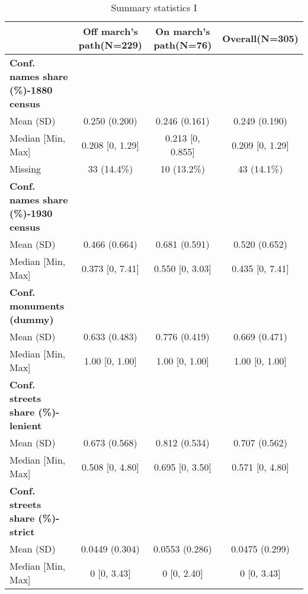 \begin{table}[h]

\caption{\label{tab:desc_stat_names}Summary statistics I}
\centering
\fontsize{8}{10}\selectfont
\begin{tabular}[t]{>{}lccc}
\toprule
 & Off march's path(N=229) & On march's path(N=76) & Overall(N=305)\\
\midrule
\textbf{Conf. names share (\%)-1880 census} &  &  & \\
Mean (SD) & 0.250 (0.200) & 0.246 (0.161) & 0.249 (0.190)\\
Median [Min, Max] & 0.208 [0, 1.29] & 0.213 [0, 0.855] & 0.209 [0, 1.29]\\
Missing & 33 (14.4\%) & 10 (13.2\%) & 43 (14.1\%)\\
\addlinespace
\textbf{Conf. names share (\%)-1930 census} &  &  & \\
Mean (SD) & 0.466 (0.664) & 0.681 (0.591) & 0.520 (0.652)\\
Median [Min, Max] & 0.373 [0, 7.41] & 0.550 [0, 3.03] & 0.435 [0, 7.41]\\
\addlinespace
\textbf{Conf. monuments (dummy)} &  &  & \\
Mean (SD) & 0.633 (0.483) & 0.776 (0.419) & 0.669 (0.471)\\
Median [Min, Max] & 1.00 [0, 1.00] & 1.00 [0, 1.00] & 1.00 [0, 1.00]\\
\addlinespace
\textbf{Conf. streets share (\%)-lenient} &  &  & \\
Mean (SD) & 0.673 (0.568) & 0.812 (0.534) & 0.707 (0.562)\\
Median [Min, Max] & 0.508 [0, 4.80] & 0.695 [0, 3.50] & 0.571 [0, 4.80]\\
\addlinespace
\textbf{Conf. streets share (\%)-strict} &  &  & \\
Mean (SD) & 0.0449 (0.304) & 0.0553 (0.286) & 0.0475 (0.299)\\
Median [Min, Max] & 0 [0, 3.43] & 0 [0, 2.40] & 0 [0, 3.43]\\
\bottomrule
\end{tabular}
\end{table}
